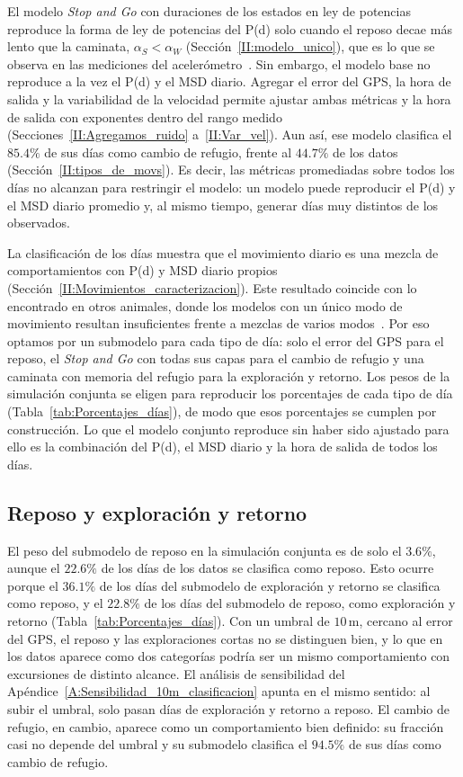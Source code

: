 El modelo \textit{Stop and Go} con duraciones de los estados en ley de potencias reproduce la forma de ley de potencias del P(d) solo cuando el reposo
decae más lento que la caminata, $\alpha_S < \alpha_W$ (Sección~\ref{II:modelo_unico}), que es lo que se observa en las mediciones del
acelerómetro~\cite{callenbach2025}. Sin embargo, el modelo base no reproduce a la vez el P(d) y el MSD diario. Agregar el error del GPS, la hora de salida
y la variabilidad de la velocidad permite ajustar ambas métricas y la hora de salida con exponentes dentro del rango medido (Secciones~\ref{II:Agregamos_ruido}
a~\ref{II:Var_vel}). Aun así, ese modelo clasifica el $85.4 \%$ de sus días como cambio de refugio, frente al $44.7 \%$ de los datos
(Sección~\ref{II:tipos_de_movs}). Es decir, las métricas promediadas sobre todos los días no alcanzan para restringir el modelo: un modelo puede reproducir
el P(d) y el MSD diario promedio y, al mismo tiempo, generar días muy distintos de los observados.

La clasificación de los días muestra que el movimiento diario es una mezcla de comportamientos con P(d) y MSD diario propios
(Sección~\ref{II:Movimientos_caracterizacion}). Este resultado coincide con lo encontrado en otros animales, donde los modelos con un único modo de
movimiento resultan insuficientes frente a mezclas de varios modos~\cite{morales2004extracting, fryxell2008multiple}. Por eso optamos por un submodelo
para cada tipo de día: solo el error del GPS para el reposo, el \textit{Stop and Go} con todas sus capas para el cambio de refugio y una caminata con
memoria del refugio para la exploración y retorno. Los pesos de la simulación conjunta se eligen para reproducir los porcentajes de cada tipo de día
(Tabla~\ref{tab:Porcentajes_días}), de modo que esos porcentajes se cumplen por construcción. Lo que el modelo conjunto reproduce sin haber sido ajustado
para ello es la combinación del P(d), el MSD diario y la hora de salida de todos los días.

\subsection{Reposo y exploración y retorno}

El peso del submodelo de reposo en la simulación conjunta es de solo el $3.6 \%$, aunque el $22.6 \%$ de los días de los datos se clasifica como reposo.
Esto ocurre porque el $36.1 \%$ de los días del submodelo de exploración y retorno se clasifica como reposo, y el $22.8 \%$ de los días del submodelo
de reposo, como exploración y retorno (Tabla~\ref{tab:Porcentajes_días}). Con un umbral de $10\,\mathrm{m}$, cercano al error del GPS, el reposo y las
exploraciones cortas no se distinguen bien, y lo que en los datos aparece como dos categorías podría ser un mismo comportamiento con excursiones de
distinto alcance. El análisis de sensibilidad del Apéndice~\ref{A:Sensibilidad_10m_clasificacion} apunta en el mismo sentido: al subir el umbral, solo
pasan días de exploración y retorno a reposo. El cambio de refugio, en cambio, aparece como un comportamiento bien definido: su fracción casi no depende
del umbral y su submodelo clasifica el $94.5 \%$ de sus días como cambio de refugio.

